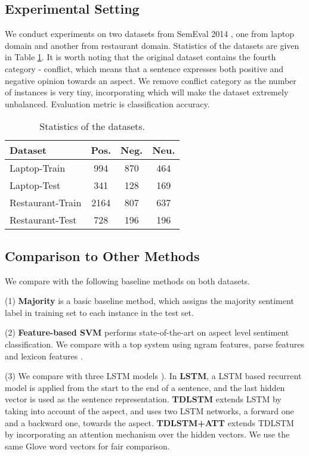 \documentclass[11pt,letterpaper]{article}
\begin{document}
\subsection{Experimental Setting}
We conduct experiments on two datasets from SemEval 2014 \cite{Pontiki2014}, one from laptop domain and another from restaurant domain. 
Statistics of the datasets are given in Table \ref{table:dataset}. {It is worth noting that the original dataset contains the fourth category - conflict, which means that a sentence expresses both positive and negative opinion towards an aspect. We remove conflict category as the number of instances is very tiny, incorporating which will make the dataset extremely unbalanced.} Evaluation metric is classification accuracy. 
\begin{table}[h]
	\centering
	\begin{tabular}{l|c|c|c}
		\hline
		Dataset & Pos. & Neg. & Neu. \\
		\hline
		Laptop-Train & 994 & 870 & 464\\
		Laptop-Test & 341 & 128 & 169\\
		Restaurant-Train & 2164& 807 & 637\\
		Restaurant-Test & 728& 196& 196\\
		\hline
	\end{tabular}
	\caption{Statistics of the datasets.}
	\label{table:dataset}
\end{table}








\subsection{Comparison to Other Methods}
We compare with the following baseline methods on both datasets.

(1) \textbf{Majority} is a basic baseline method, which assigns the majority sentiment label in training set to each instance in the test set.

(2) \textbf{Feature-based SVM} performs state-of-the-art on aspect level sentiment classification.
We compare with a top system using ngram features, parse features and lexicon features \cite{Kiritchenko2014-SemEval}. 


(3) We compare with three LSTM models \cite{Tang2015arxiv}). In \textbf{LSTM}, a LSTM based recurrent model is applied from the start to the end of a sentence, and the last hidden vector is used as the sentence representation. \textbf{TDLSTM} extends LSTM by taking into account of the aspect, and uses two LSTM networks, a forward one and a backward one, towards the aspect.
\textbf{TDLSTM+ATT} extends TDLSTM by incorporating an attention mechanism \cite{Bahdanau2015} over the  hidden vectors.
We use the same Glove word vectors for fair comparison. 
\end{document}
